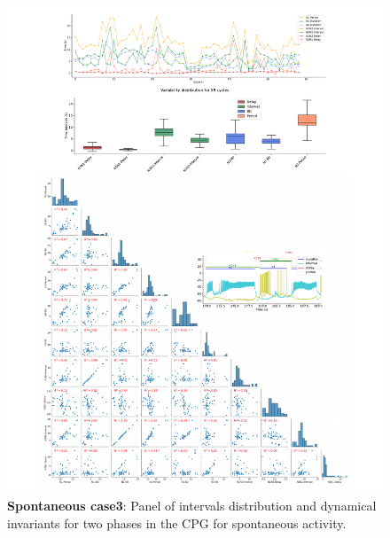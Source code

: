 \begin{figure}[htbp]
\centering
\includegraphics[width=1.1\textwidth]{./invariants/data/SUSSEX/prep3/images/2phases/panel_with_pairplot.pdf}
\caption{\textbf{Spontaneous case3}: Panel of intervals distribution and dynamical invariants for two phases in the CPG for spontaneous activity.}
\label{fig:prep3 2phases invariants pairplot}
\end{figure}

